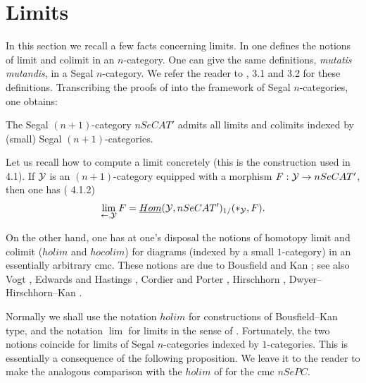 
\clearpage
\section{Limits}
\label{limitespage}

In this section we recall a few facts concerning limits. In \cite{limits} one
defines the notions of limit and colimit in an $n$-category. One can give the
same definitions, {\em mutatis mutandis}, in a Segal $n$-category. We refer the
reader to \cite{limits}, 3.1 and 3.2 for these definitions. Transcribing the
proofs of \cite{limits} into the framework of Segal $n$-categories, one
obtains:

\begin{theorem}
The Segal $(n+1)$-category $nSeCAT'$ admits all limits and colimits indexed by
(small) Segal $(n+1)$-categories.
\end{theorem}

Let us recall how to compute a limit concretely (this is the construction used
in \cite{limits} 4.1). If ${\cal Y}$ is an $(n+1)$-category equipped with a
morphism $F: {\cal Y} \rightarrow nSeCAT'$, then one has (\cite{limits} 4.1.2)
$$
\lim _{\leftarrow , {\cal Y}} F
= \underline{Hom}({\cal Y} , nSeCAT')_{1/}(\ast _{{\cal Y}}, F).
$$

On the other hand, one has at one's disposal the notions of homotopy limit and
colimit ($holim$ and $hocolim$) for diagrams (indexed by a small
$1$-category) in an essentially arbitrary cmc. These notions are due to
Bousfield and Kan \cite{BousfieldKan}; see also
Vogt \cite{Vogt}, Edwards and Hastings \cite{EH},
Cordier and Porter \cite{CordierPorter2},
Hirschhorn \cite{Hirschhorn},
Dwyer--Hirschhorn--Kan \cite{DHK}.

Normally we shall use the notation $holim$ for constructions of
Bousfield--Kan type, and the notation $\lim$ for limits in the sense of
\cite{limits}. Fortunately, the two notions coincide for limits of Segal
$n$-categories indexed by $1$-categories. This is essentially a consequence of
the following proposition. We leave it to the reader to make the analogous
comparison with the $holim$ of \cite{Hirschhorn} for the cmc $nSePC$.

